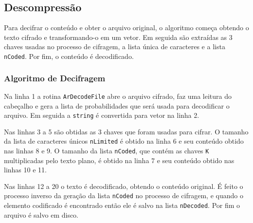 \subsection{Descompressão}

Para decifrar o conteúdo e obter o arquivo original, o algoritmo começa obtendo o texto cifrado e transformando-o em um vetor. Em seguida são extraídas as 3 chaves usadas no processo de cifragem, a lista única de caracteres e a lista \texttt{nCoded}. Por fim, o conteúdo é decodificado.

\subsubsection{Algoritmo de Decifragem}

Na linha 1 a rotina \texttt{ArDecodeFile} abre o arquivo cifrado, faz uma leitura do cabeçalho e gera a lista de probabilidades que será usada para decodificar o arquivo. Em seguida a \texttt{string} é convertida para vetor na linha 2.

Nas linhas 3 a 5 são obtidas as 3 chaves que foram usadas para cifrar. O tamanho da lista de caracteres únicos \texttt{nLimited} é obtido na linha 6 e seu conteúdo obtido nas linhas 8 e 9. O tamanho da lista \texttt{nCoded}, que contém as chaves \texttt{K} multiplicadas pelo texto plano, é obtido na linha 7 e seu conteúdo obtido nas linhas 10 e 11.

Nas linhas 12 a 20 o texto é decodificado, obtendo o conteúdo original. É feito o processo inverso da geração da lista \texttt{nCoded} no processo de cifragem, e quando o elemento codificado é encontrado então ele é salvo na lista \texttt{nDecoded}. Por fim o arquivo é salvo em disco.

